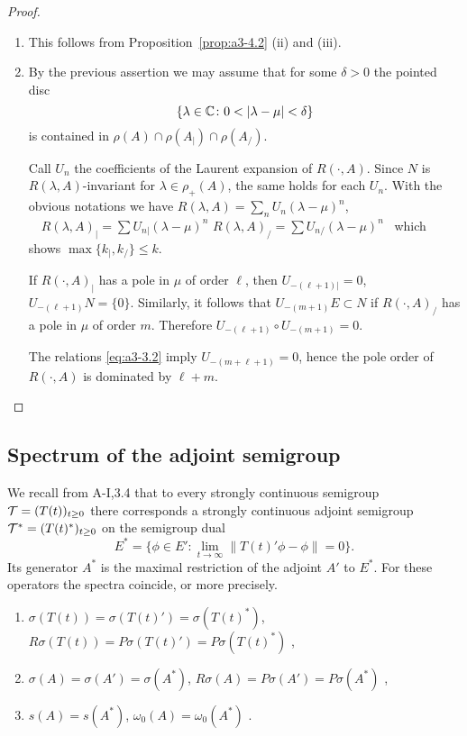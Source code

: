 \begin{proof}
\begin{enumerate}[\upshape (i), wide, labelindent=.5em]
\item 
This follows from Proposition~\ref{prop:a3-4.2} (ii) and (iii).

\item 
By the previous assertion we may assume that for some $\delta > 0$ the pointed disc
\[
\{\lambda \in \mathbb{C} \colon 0 < |\lambda-\mu| < \delta\}
\]
is contained in $\rho(A) \cap \rho(A_{|}) \cap \rho(A_{/})$.

Call $U_{n}$ the coefficients of the Laurent expansion of $R(\cdot,A)$.
Since $N$ is $R(\lambda,A)$-invariant for $\lambda \in \rho_{+}(A)$, the same holds for each $U_{n}$.
With the obvious notations we have \quad
$R(\lambda,A) = \sum_{n} U_{n}(\lambda-\mu)^{n}$, $\quad R(\lambda,A)_{|} = \sum U_{n|}(\lambda-\mu)^{n}$ \quad {} \quad $R(\lambda,A)_{/} = \sum U_{n/}(\lambda-\mu)^{n}$~
which shows $\max\{k_{|},k_{/}\} \leq k$.

If $R(\cdot,A)_{|}$ has a pole in $\mu$ of order $\ell$, then $U_{-(\ell+1)|} = 0$, \ie $U_{-(\ell+1)}N = \{0\}$.
Similarly, it follows that $U_{-(m+1)}E \subset N$ if $R(\cdot,A)_{/}$ has a pole in $\mu$ of order $m$.
Therefore $U_{-(\ell+1)} \circ U_{-(m+1)} = 0$.

The relations \eqref{eq:a3-3.2} imply $U_{-(m+\ell+1)} = 0$, hence the pole order of $R(\cdot,A)$ is dominated 
by $\ell + m$.
\end{enumerate}
\end{proof}

\subsection{Spectrum of the adjoint semigroup}\label{subsec:a3-4.4}%
We recall from A-I,3.4 that to every strongly continuous semigroup $\mathcal{T} = (T(t))_{t \geq 0}$ there corresponds a strongly continuous adjoint semigroup $\mathcal{T}^{*} = (T(t)^{*})_{t \geq 0}$ on the semigroup dual
\[
E^{*} = \{\phi \in E' \colon \lim_{t \to \infty} \|T(t)'\phi-\phi\| = 0\} .
\]
Its generator $A^{*}$ is the maximal restriction of the adjoint $A'$ to $E^{*}$.
For these operators the spectra coincide, or more precisely.
\begin{enumerate}[\upshape (i)]
\item 
$\sigma(T(t)) = \sigma(T(t)') = \sigma(T(t)^{*})$,\\
$R\sigma(T(t)) = P\sigma(T(t)') = P\sigma(T(t)^{*})$ ,

\item 
$\sigma(A) = \sigma(A') = \sigma(A^{*})$, $R\sigma(A) = P\sigma(A') = P\sigma(A^{*})$ ,
\item 
$s(A) = s(A^{*})$, $\omega_{0}(A) = \omega_{0}(A^{*})$ .
\end{enumerate}

